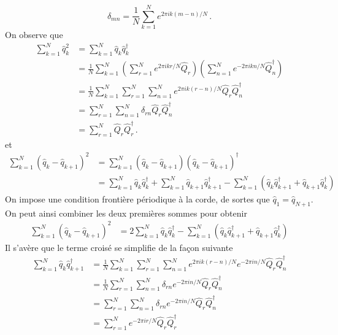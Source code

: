 \documentclass{article}
\numberwithin{equation}{section}
\theoremstyle{solution}
\begin{document}
\begin{equation}
        \delta_{mn} = \frac{1}{N}\sum_{k=1}^{N}e^{2\pi i k(m-n)/N}\, .
\end{equation} 
On observe que
\begin{align*}
        \sum_{k=1}^{N}\hat{q}_k^2 &= \sum_{k=1}^{N}\hat{q}_k \hat{q}^{\dagger}_k\\
         &= \frac{1}{N}\sum_{k=1}^{N}\left( \sum_{r=1}^{N} e^{2\pi i k r/N} \hat{Q}_r\right) \left( \sum_{n=1}^{N}e^{-2\pi i k n / N} \hat{Q}^{\dagger}_n \right) \\
         &= \frac{1}{N}\sum_{k=1}^{N}\sum_{r=1}^{N}\sum_{n=1}^{N} e^{2\pi i k (r-n)/N} \hat{Q}_r \hat{Q}^{\dagger}_n \\
         &= \sum_{r=1}^{N}\sum_{n=1}^{N} \delta_{rn} \hat{Q}_r \hat{Q}^{\dagger}_n \\
         &= \sum_{r=1}^{N} \hat{Q}_r \hat{Q}^{\dagger}_r \, .
\end{align*} 
et
\begin{align*}
        \sum_{k=1}^{N}(\hat{q}_k - \hat{q}_{k+1})^{2} &= \sum_{k=1}^{N}(\hat{q}_k - \hat{q}_{k+1})(\hat{q}_k - \hat{q}_{k+1})^{\dagger}\\
        &= \sum_{k=1}^{N}\hat{q}_k\hat{q}^{\dagger}_k + \sum_{k=1}^{N}\hat{q}_{k+1}\hat{q}^{\dagger}_{k+1} 
        - \sum_{k=1}^{N}(\hat{q}_{k}\hat{q}^{\dagger}_{k+1} + \hat{q}_{k+1}\hat{q}^{\dagger}_{k})
\end{align*} 
On impose une condition frontière périodique à la corde, de sortes que $\hat{q}_1 = \hat{q}_{N+1}$. On peut ainsi combiner les 
deux premières sommes pour obtenir
\begin{align*}
        \sum_{k=1}^{N}(\hat{q}_k - \hat{q}_{k+1})^{2} 
        &= 2\sum_{k=1}^{N}\hat{q}_k\hat{q}^{\dagger}_k 
        - \sum_{k=1}^{N}(\hat{q}_{k}\hat{q}^{\dagger}_{k+1} + \hat{q}_{k+1}\hat{q}^{\dagger}_{k})
\end{align*} 
Il s'avère que le terme croisé se simplifie de la façon suivante
\begin{align*}
        \sum_{k=1}^{N}\hat{q}_{k}\hat{q}^{\dagger}_{k+1} &= \frac{1}{N}\sum_{k=1}^{N}\sum_{r=1}^{N}\sum_{n=1}^{N}e^{2\pi ik(r-n)/N}e^{-2\pi i n/N}\hat{Q}_{r}\hat{Q}^{\dagger}_{n} \\
        &= \frac{1}{N}\sum_{r=1}^{N}\sum_{n=1}^{N} \delta_{rn} e^{-2\pi i n/N}\hat{Q}_{r}\hat{Q}^{\dagger}_{n} \\
        &= \sum_{r=1}^{N}\sum_{n=1}^{N} \delta_{rn} e^{-2\pi i n/N}\hat{Q}_{r}\hat{Q}^{\dagger}_{n} \\
        &= \sum_{r=1}^{N} e^{-2\pi i r/N}\hat{Q}_{r}\hat{Q}^{\dagger}_{r}
\end{align*}
\end{document}
